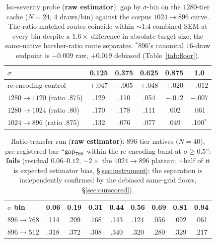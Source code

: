 \begin{table}[h]
\caption{Iso-severity probe (\textbf{raw estimator}): gap by $\sigma$-bin
on the $1280$-tier cache
($N{=}24$, $4$ draws/bin) against the corpus $1024{\to}896$ curve. The
ratio-matched routes coincide within ${\sim}1.4$ combined SEM at every bin
despite a $1.6\times$ difference in absolute target size; the same-native
harsher-ratio route separates. $^{*}$$896$'s canonical $16$-draw endpoint
is $-0.009$ raw, $+0.019$ debiased (Table~\ref{tab:floor}).}
\label{tab:isoseverity}
\centering
\small
\begin{tabular}{lccccc}
\toprule
$\sigma$ & 0.125 & 0.375 & 0.625 & 0.875 & 1.0 \\
\midrule
re-encoding control & $+.047$ & $-.005$ & $+.048$ & $+.020$ & $-.012$ \\
$1280{\to}1120$ (ratio $.875$) & .129 & .110 & .054 & $-.012$ & $-.007$ \\
$1280{\to}1024$ (ratio $.80$)  & .170 & .178 & .111 & .002 & .061 \\
$1024{\to}896$ (ratio $.875$)  & .132 & .076 & .077 & .049 & .100$^{*}$ \\
\bottomrule
\end{tabular}
\end{table}

\begin{table}[h]
\caption{Ratio-transfer run (\textbf{raw estimator}): $896$-tier natives
($N{=}40$), pre-registered
bar ``$\mathrm{gap}_{768}$ within the re-encoding band at $\sigma \ge 0.5$'':
\textbf{fails} (residual $0.06$--$0.12$, ${\sim}2\times$ the
$1024{\to}896$ plateau; ${\sim}$half of it is expected estimator bias,
\S\ref{sec:instrument}; the separation is independently confirmed by
the debiased same-grid floors, \S\ref{sec:ourscored}).}
\label{tab:phase1a}
\centering
\small
\begin{tabular}{lcccccccc}
\toprule
$\sigma$ bin & 0.06 & 0.19 & 0.31 & 0.44 & 0.56 & 0.69 & 0.81 & 0.94 \\
\midrule
$896{\to}768$ & .114 & .209 & .168 & .143 & .124 & .056 & .092 & .061 \\
$896{\to}512$ & .318 & .372 & .308 & .340 & .320 & .280 & .329 & .217 \\
\bottomrule
\end{tabular}
\end{table}

